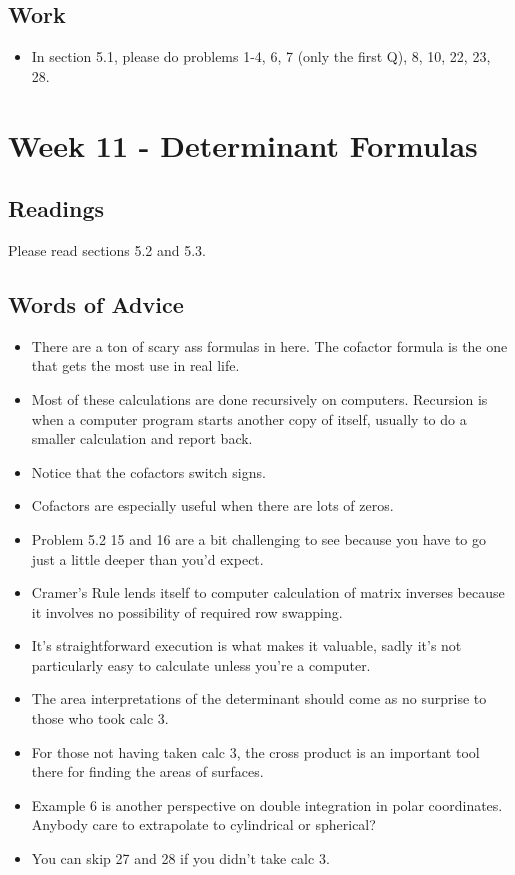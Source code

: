 	\subsection{Work}
		\begin{itemize}
			\item In section 5.1, please do problems 1-4, 6, 7 (only the first Q), 8,  10, 22, 23, 28.
		\end{itemize}

	\clearpage



	\section{Week 11 - Determinant Formulas}

	\subsection{Readings}
		Please read sections 5.2 and 5.3.

	\subsection{Words of Advice}
		\begin{itemize}
			\item There are a ton of scary ass formulas in here. The cofactor formula is the one that gets the most use in real life.
			\item Most of these calculations are done recursively on computers. Recursion is when a computer program starts another copy of itself, usually to do a smaller calculation and report back.
			\item Notice that the cofactors switch signs.
			\item Cofactors are especially useful when there are lots of zeros.
			\item Problem 5.2 15 and 16 are a bit challenging to see because you have to go just a little deeper than you'd expect.
			\item Cramer's Rule lends itself to computer calculation of matrix inverses because it involves no possibility of required row swapping.
			\item It's straightforward execution is what makes it valuable, sadly it's not particularly easy to calculate unless you're a computer.
			\item The area interpretations of the determinant should come as no surprise to those who took calc 3.
			\item For those not having taken calc 3, the cross product is an important tool there for finding the areas of surfaces.
			\item Example 6 is another perspective on double integration in polar coordinates. Anybody care to extrapolate to cylindrical or spherical?
			\item You can skip 27 and 28 if you didn't take calc 3.
		\end{itemize}

